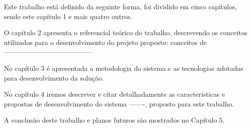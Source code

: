 


Este trabalho está definido da seguinte forma, foi dividido em cinco capítulos, sendo este capítulo 1 e mais quatro outros.\par

O capítulo 2 apresenta o referencial teórico do trabalho, descrevendo os conceitos utilizados para o desenvolvimento do projeto proposto: conceitos de ---------------------------------------\par

No capítulo 3 é apresentada a metodologia do sistema e as tecnologias adotadas para desenvolvimento da solução.\par

No capítulo 4 iremos descrever e citar detalhadamente as características e propostas de desenvolvimento do sistema -------, proposto para este trabalho.\par

A conclusão deste trabalho e planos futuros são mostrados no Capítulo 5.\par